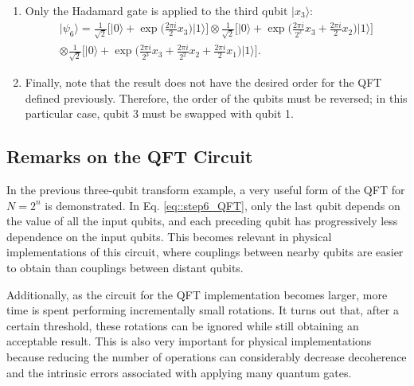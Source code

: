 \documentclass[a4paper]{article}
\begin{document}
\begin{enumerate}
\begin{equation}
\vert \psi_5\rangle=\vert x_3\rangle \otimes \frac{1}{\sqrt{2}}\bigg[ \vert 0\rangle + \exp{\bigg(\frac{2\pi i}{2^2} x_3 + \frac{2\pi i}{2} x_2 \bigg)}\vert 1\rangle\bigg] \otimes  \frac{1}{\sqrt{2}}\bigg[ \vert 0\rangle + \exp{\bigg(\frac{2\pi i}{2^3} x_3 +\frac{2\pi i}{2^2} x_2+\frac{2\pi i}{2} x_1\bigg)}\vert 1\rangle\bigg].
\end{equation}
\item Only the Hadamard gate is applied to the third qubit $\vert x_3\rangle$:
\begin{equation}\label{eq::step6_QFT}
\begin{aligned}
\vert \psi_6 \rangle= \frac{1}{\sqrt{2}}\bigg[ \vert 0\rangle + \exp{\bigg( \frac{2\pi i}{2} x_3 \bigg)}\vert 1\rangle\bigg] \otimes \frac{1}{\sqrt{2}}\bigg[ \vert 0\rangle + \exp{\bigg(\frac{2\pi i}{2^2} x_3 + \frac{2\pi i}{2} x_2 \bigg)}\vert 1\rangle\bigg]\\
 \otimes  \frac{1}{\sqrt{2}}\bigg[ \vert 0\rangle + \exp{\bigg(\frac{2\pi i}{2^3} x_3 +\frac{2\pi i}{2^2} x_2+\frac{2\pi i}{2} x_1\bigg)}\vert 1\rangle\bigg].
\end{aligned}
\end{equation}
\item Finally, note that the result does not have the desired order for the QFT defined previously. Therefore, the order of the qubits must be reversed; in this particular case, qubit 3 must be swapped with qubit 1.
\end{enumerate}

\subsection{Remarks on the QFT Circuit}
In the previous three-qubit transform example, a very useful form of the QFT for $N=2^n$ is demonstrated. In Eq. \ref{eq::step6_QFT}, only the last qubit depends on the value of all the input qubits, and each preceding qubit has progressively less dependence on the input qubits. This becomes relevant in physical implementations of this circuit, where couplings between nearby qubits are easier to obtain than couplings between distant qubits.

Additionally, as the circuit for the QFT implementation becomes larger, more time is spent performing incrementally small rotations. It turns out that, after a certain threshold, these rotations can be ignored while still obtaining an acceptable result. This is also very important for physical implementations because reducing the number of operations can considerably decrease decoherence and the intrinsic errors associated with applying many quantum gates.
\end{document}
